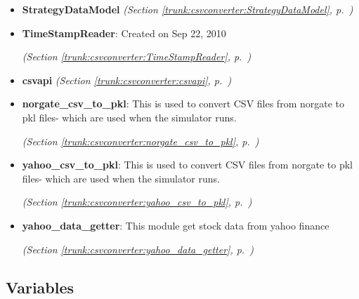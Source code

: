 \begin{itemize}
\setlength{\parskip}{0ex}
\item \textbf{StrategyDataModel}
  \textit{(Section \ref{trunk:csvconverter:StrategyDataModel}, p.~\pageref{trunk:csvconverter:StrategyDataModel})}

\item \textbf{TimeStampReader}: Created on Sep 22, 2010



  \textit{(Section \ref{trunk:csvconverter:TimeStampReader}, p.~\pageref{trunk:csvconverter:TimeStampReader})}

\item \textbf{csvapi}
  \textit{(Section \ref{trunk:csvconverter:csvapi}, p.~\pageref{trunk:csvconverter:csvapi})}

\item \textbf{norgate\_csv\_to\_pkl}: This is used to convert CSV files from norgate to pkl files- which are used
when the simulator runs.



  \textit{(Section \ref{trunk:csvconverter:norgate_csv_to_pkl}, p.~\pageref{trunk:csvconverter:norgate_csv_to_pkl})}

\item \textbf{yahoo\_csv\_to\_pkl}: This is used to convert CSV files from norgate to pkl files- which are used
when the simulator runs.



  \textit{(Section \ref{trunk:csvconverter:yahoo_csv_to_pkl}, p.~\pageref{trunk:csvconverter:yahoo_csv_to_pkl})}

\item \textbf{yahoo\_data\_getter}: This module get stock data from yahoo finance



  \textit{(Section \ref{trunk:csvconverter:yahoo_data_getter}, p.~\pageref{trunk:csvconverter:yahoo_data_getter})}

\end{itemize}



  \subsection{Variables}

